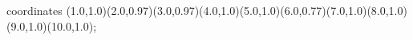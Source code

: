 					coordinates { (1.0,1.0)(2.0,0.97)(3.0,0.97)(4.0,1.0)(5.0,1.0)(6.0,0.77)(7.0,1.0)(8.0,1.0)(9.0,1.0)(10.0,1.0)};